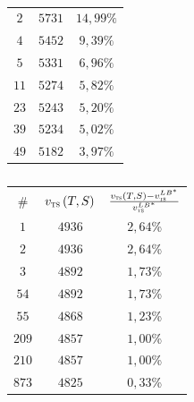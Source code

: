 \begin{table}[!htbp]
\begin{subtable}[b]{0.3\textwidth}
\begin{tabular}{ccc}
			$2$	&	$5731$	&	$14,99\%$	\\
			$4$	&	$5452$	&	$9,39\%$	\\
			$5$	&	$5331$	&	$6,96\%$	\\
			$11$	&	$5274$	&	$5,82\%$	\\
			$23$	&	$5243$	&	$5,20\%$	\\
			$39$	&	$5234$	&	$5,02\%$	\\
			$49$	&	$5182$	&	$3,97\%$	\\\hline                                                                                                  
		\end{tabular}
		\caption{}
		\label{fig:rrimst2tab:b}
	\end{subtable}
	\hfill
	\begin{subtable}[b]{0.3\textwidth}
		\centering
		\begin{tabular}{ccc}
			\hline
			\# & $v_{\textsc{ts}} \left( T, S \right)$ & $\frac{v_{\textsc{ts}} \left( T, S \right) - v_{\textsc{ts}}^{LB^{\ast}}}{v_{\textsc{ts}}^{LB^{\ast}}}$ \\
			$1$	&	$4936$	&	$2,64$\%	\\
			$2$	&	$4936$	&	$2,64$\%	\\
			$3$	&	$4892$	&	$1,73$\%	\\
			$54$	&	$4892$	&	$1,73$\%	\\
			$55$	&	$4868$	&	$1,23$\%	\\
			$209$	&	$4857$	&	$1,00$\%	\\
			$210$	&	$4857$	&	$1,00$\%	\\
			$873$	&	$4825$	&	$0,33$\%	\\\hline                                                                                                     
		\end{tabular}
		\caption{}
		\label{fig:rrimst2tab:c}
	\end{subtable}
	\hfill\null
\end{table}

